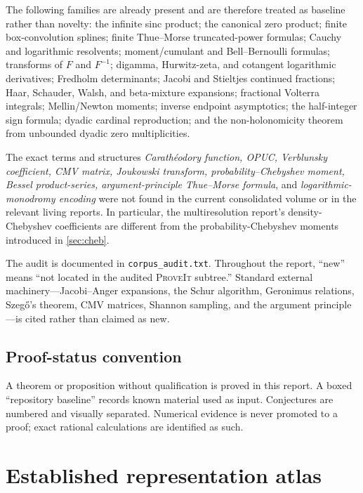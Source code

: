 \documentclass[11pt,oneside]{article}
\theoremstyle{definition}
\newcommand{\repo}{\textsc{ProveIt}}
\begin{document}
The following families are already present and are therefore treated as baseline rather
than novelty: the infinite sinc product; the canonical zero product; finite box-convolution
splines; finite Thue--Morse truncated-power formulas; Cauchy and logarithmic resolvents;
moment/cumulant and Bell--Bernoulli formulas; transforms of \(F\) and \(F^{-1}\); digamma,
Hurwitz-zeta, and cotangent logarithmic derivatives; Fredholm determinants; Jacobi and
Stieltjes continued fractions; Haar, Schauder, Walsh, and beta-mixture expansions;
fractional Volterra integrals; Mellin/Newton moments; inverse endpoint asymptotics; the
half-integer sign formula; dyadic cardinal reproduction; and the non-holonomicity theorem
from unbounded dyadic zero multiplicities.

The exact terms and structures \emph{Carath\'eodory function, OPUC, Verblunsky coefficient,
CMV matrix, Joukowski transform, probability--Chebyshev moment, Bessel product-series,
argument-principle Thue--Morse formula}, and \emph{logarithmic-monodromy encoding} were not
found in the current consolidated volume or in the relevant living reports. In particular,
the multiresolution report's density-Chebyshev coefficients are different from the
probability-Chebyshev moments introduced in \cref{sec:cheb}.

\begin{baselinebox}
The audit is documented in \texttt{corpus\_audit.txt}. Throughout the report, ``new'' means
``not located in the audited \repo{} subtree.'' Standard external machinery---Jacobi--Anger
expansions, the Schur algorithm, Geronimus relations, Szeg\H{o}'s theorem, CMV matrices,
Shannon sampling, and the argument principle---is cited rather than claimed as new.
\end{baselinebox}

\subsection{Proof-status convention}

A theorem or proposition without qualification is proved in this report. A boxed
``repository baseline'' records known material used as input. Conjectures are numbered and
visually separated. Numerical evidence is never promoted to a proof; exact rational
calculations are identified as such.

\section{Established representation atlas}
\label{sec:baseline}
\end{document}
